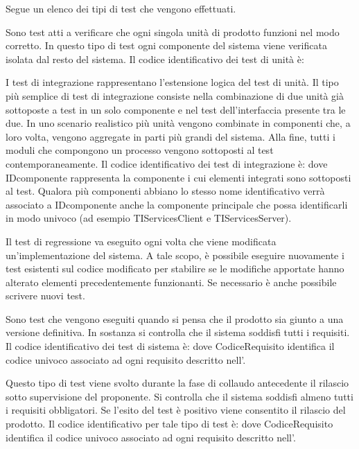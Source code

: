 \documentclass[a4paper, titlepage]{article}
\begin{document}
Segue un elenco dei tipi di test che vengono effettuati.

Sono test atti a verificare che ogni singola unità di prodotto funzioni nel modo corretto. In questo tipo di test ogni componente del sistema viene verificata isolata dal resto del sistema.
Il codice identificativo dei test di unità è: 

I test di integrazione rappresentano l'estensione logica del test di unità. Il tipo più semplice di test di integrazione consiste nella combinazione di due unità già sottoposte a test in un solo componente e nel test dell'interfaccia presente tra le due. In uno scenario realistico più unità vengono combinate in componenti che, a loro volta, vengono aggregate in parti più grandi del sistema. Alla fine, tutti i moduli che compongono un processo vengono sottoposti al test contemporaneamente.
Il codice identificativo dei test di integrazione è:  dove IDcomponente rappresenta la componente i cui elementi integrati sono sottoposti al test. Qualora più componenti abbiano lo stesso nome identificativo verrà associato a IDcomponente anche la componente principale che possa identificarli in modo univoco (ad esempio TIServicesClient e TIServicesServer).

Il test di regressione va eseguito ogni volta che viene modificata un'implementazione del sistema. A tale scopo, è possibile eseguire nuovamente i test esistenti sul codice modificato per stabilire se le modifiche apportate hanno alterato elementi precedentemente funzionanti. Se necessario è anche possibile scrivere nuovi test.

Sono test che vengono eseguiti quando si pensa che il prodotto sia giunto a una versione definitiva. In sostanza si controlla che il sistema soddisfi tutti i requisiti.
Il codice identificativo dei test di sistema è:  dove CodiceRequisito identifica il codice univoco associato ad ogni requisito descritto nell'.

Questo tipo di test viene svolto durante la fase di collaudo antecedente il rilascio sotto supervisione del proponente. Si controlla che il sistema soddisfi almeno tutti i requisiti obbligatori. Se l'esito del test è positivo viene consentito il rilascio del prodotto.
Il codice identificativo per tale tipo di test è:  dove CodiceRequisito identifica il codice univoco associato ad ogni requisito descritto nell'.
\end{document}
